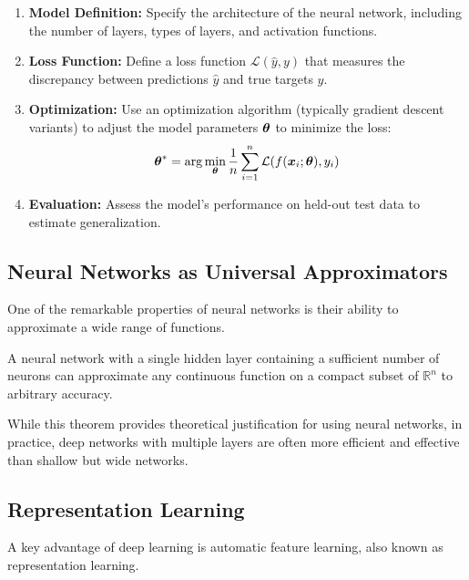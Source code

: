 \begin{enumerate}
    \item \textbf{Model Definition:} Specify the architecture of the neural network, including the number of layers, types of layers, and activation functions.
    
    \item \textbf{Loss Function:} Define a loss function $\mathcal{L}(\hat{y}, y)$ that measures the discrepancy between predictions $\hat{y}$ and true targets $y$.
    
    \item \textbf{Optimization:} Use an optimization algorithm (typically gradient descent variants) to adjust the model parameters $\boldsymbol{\theta}$ to minimize the loss:
    \begin{equation}
        \boldsymbol{\theta}^* = \arg\min_{\boldsymbol{\theta}} \frac{1}{n} \sum_{i=1}^{n} \mathcal{L}(f(\boldsymbol{x}_i; \boldsymbol{\theta}), y_i)
    \end{equation}
    
    \item \textbf{Evaluation:} Assess the model's performance on held-out test data to estimate generalization.
\end{enumerate}

\subsection{Neural Networks as Universal Approximators}

One of the remarkable properties of neural networks is their ability to approximate a wide range of functions.

\begin{theorem}
A neural network with a single hidden layer containing a sufficient number of neurons can approximate any continuous function on a compact subset of $\mathbb{R}^n$ to arbitrary accuracy.
\end{theorem}

While this theorem provides theoretical justification for using neural networks, in practice, deep networks with multiple layers are often more efficient and effective than shallow but wide networks.

\subsection{Representation Learning}

A key advantage of deep learning is automatic feature learning, also known as representation learning.


